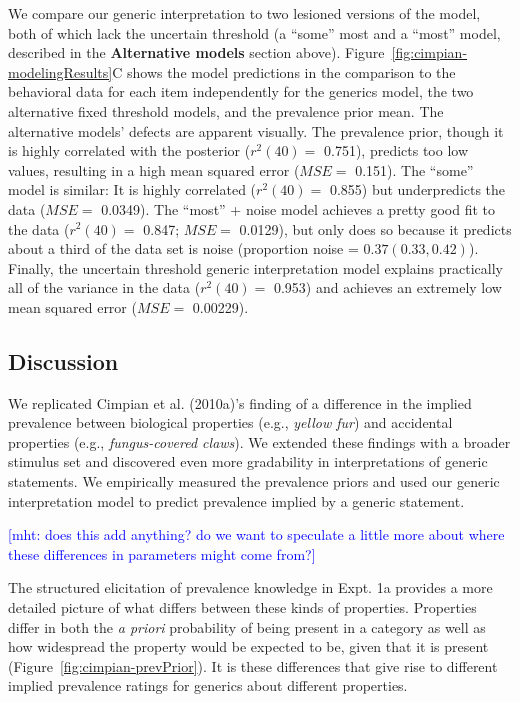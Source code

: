 \documentclass[,man,floatsintext]{apa6}
\theoremstyle{definition}
\theoremstyle{definition}
\theoremstyle{definition}
\theoremstyle{remark}
\begin{document}
We compare our generic interpretation to two lesioned versions of the
model, both of which lack the uncertain threshold (a \enquote{some} most
and a \enquote{most} model, described in the \textbf{Alternative models}
section above). Figure~\ref{fig:cimpian-modelingResults}C shows the
model predictions in the comparison to the behavioral data for each item
independently for the generics model, the two alternative fixed
threshold models, and the prevalence prior mean. The alternative models'
defects are apparent visually. The prevalence prior, though it is highly
correlated with the posterior (\(r^2(40)=\) 0.751), predicts too low
values, resulting in a high mean squared error (\(MSE=\) 0.151). The
\enquote{some} model is similar: It is highly correlated (\(r^2(40)=\)
0.855) but underpredicts the data (\(MSE=\) 0.0349). The \enquote{most}
+ noise model achieves a pretty good fit to the data (\(r^2(40) =\)
0.847; \(MSE=\) 0.0129), but only does so because it predicts about a
third of the data set is noise (proportion noise =
\(0.37 (0.33, 0.42)\)). Finally, the uncertain threshold generic
interpretation model explains practically all of the variance in the
data (\(r^2(40) =\) 0.953) and achieves an extremely low mean squared
error (\(MSE =\) 0.00229).

\hypertarget{discussion}{%
\subsection{Discussion}\label{discussion}}

We replicated Cimpian et al. (2010a)'s finding of a difference in the
implied prevalence between biological properties (e.g., \emph{yellow
fur}) and accidental properties (e.g., \emph{fungus-covered claws}). We
extended these findings with a broader stimulus set and discovered even
more gradability in interpretations of generic statements. We
empirically measured the prevalence priors and used our generic
interpretation model to predict prevalence implied by a generic
statement.

{\textcolor{Blue}{[mht: does this add anything? do we want to speculate a little more about where these differences in parameters might come from?]}}

The structured elicitation of prevalence knowledge in Expt. 1a provides
a more detailed picture of what differs between these kinds of
properties. Properties differ in both the \emph{a priori} probability of
being present in a category as well as how widespread the property would
be expected to be, given that it is present
(Figure~\ref{fig:cimpian-prevPrior}). It is these differences that give
rise to different implied prevalence ratings for generics about
different properties.
\end{document}
